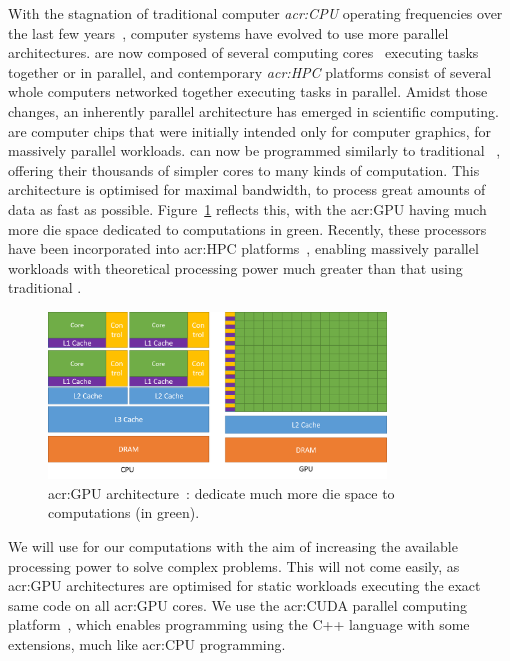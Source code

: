 With the stagnation of traditional computer \textit{\acrfull{acr:CPU}} operating frequencies over
the last few years~\cite{Parkhurst2006}, computer systems have evolved to use more parallel
architectures.  are now composed of several computing cores~\cite{Nayfeh1997}
executing tasks together or in parallel, and contemporary \textit{\acrfull{acr:HPC}} platforms
consist of several whole computers networked together executing tasks in parallel. Amidst those
changes, an inherently parallel architecture has emerged in scientific computing.
\textit{} are computer chips that were initially intended only for computer
graphics, for massively parallel workloads.  can now be programmed similarly to
traditional ~\cite{Owens2008}, offering their thousands of simpler cores to many
kinds of computation. This architecture is optimised for maximal bandwidth, to process great amounts
of data as fast as possible. Figure~\ref{fig:intro_gpu} reflects this, with the \acrshort{acr:GPU}
having much more die space dedicated to computations in green. Recently, these processors have been
incorporated into \acrshort{acr:HPC} platforms~\cite{Fan2004}, enabling massively parallel workloads
with theoretical processing power much greater than that using traditional .

\begin{figure}[H]
	\centering
	\includegraphics[width=0.8\textwidth]{Chapter_introduction/media/gpu-devotes-more-transistors-to-data-processing}
	\caption{\Acrshort{acr:GPU} architecture~\cite{Nvidia2021}:  dedicate much more die space to computations (in green).}\label{fig:intro_gpu}
\end{figure}

We will use  for our computations with the aim of increasing the available
processing power to solve complex problems. This will not come easily, as \acrshort{acr:GPU}
architectures are optimised for static workloads executing the exact same code on all
\acrshort{acr:GPU} cores. We use the \acrshort{acr:CUDA} parallel computing
platform~\cite{Garland2008}, which enables programming  using the C++ language
with some extensions, much like \acrshort{acr:CPU} programming.

